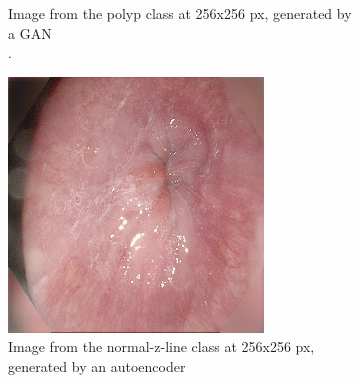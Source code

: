 \begin{figure}[t]
\begin{subfigure}[b]{0.4\textwidth}
            \caption[Hate to be this guy]%
            {{\small Image from the polyp class at 256x256 px, generated by a GAN \\.}}    
            \label{fig:polypGANBLACK}
        \end{subfigure}
        \qquad\vfill%
        \begin{subfigure}[b]{0.4\textwidth}   
            \centering 
            \includegraphics[width=\textwidth]{experiments/figures/blackcorner/zAE.jpg}
            \caption[]%
            {{\small Image from the normal-z-line class at 256x256 px, generated by an autoencoder }}    
            \label{fig:zAEBLACK}
        \end{subfigure}
        \qquad%
        \begin{subfigure}[b]{0.4\textwidth}   
            \centering 

\end{subfigure}
\end{figure}
